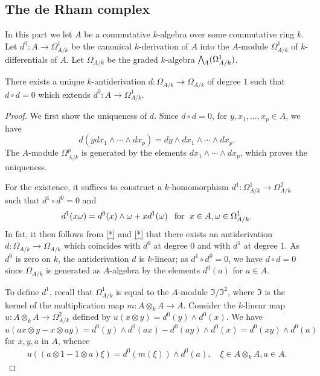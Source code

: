 \subsection{The de Rham complex}
In this part we let $A$ be a commutative $k$-algebra over some commutative ring $k$. Let $d^0:A\to\Omega_{A/k}^1$ be the canonical $k$-derivation of $A$ into the $A$-module $\Omega_{A/k}^1$ of $k$-differentials of $A$. Let $\Omega_{A/k}$ be the graded $k$-algebra $\bigw_A(\Omega_{A/k}^1)$.
\begin{proposition}\label{module complex de Rham antiderivation exist}
There exists a unique $k$-antiderivation $d:\Omega_{A/k}\to\Omega_{A/k}$ of degree $1$ such that $d\circ d=0$ which extends $d^0:A\to\Omega_{A/k}^1$.
\end{proposition}
\begin{proof}
We first show the uniqueness of $d$. Since $d\circ d=0$, for $y,x_1,\dots,x_p\in A$, we have
\[d(y dx_1\wedge\cdots\wedge dx_p)=dy\wedge dx_1\wedge\cdots\wedge dx_p.\]
The $A$-module $\Omega_{A/k}^p$ is generated by the elements $dx_1\wedge\cdots\wedge dx_p$, which proves the uniqueness.\par
For the existence, it suffices to construct a $k$-homomorphism $d^1:\Omega_{A/k}^1\to\Omega_{A/k}^2$ such that $d^1\circ d^0=0$ and
\begin{equation}\label{module complex de Rham antiderivation exist-1}
d^1(x\omega)=d^0(x)\wedge\omega+xd^1(\omega)\hspace{8pt}\text{for}\hspace{6pt} x\in A,\omega\in\Omega_{A/k}^1.
\end{equation}
In fat, it then follows from \cref{*} and \cref{*} that there exists an antiderivation $d:\Omega_{A/k}\to\Omega_{A/k}$ which coincides with $d^0$ at degree $0$ and with $d^1$ at degree $1$. As $d^0$ is zero on $k$, the antiderivation $d$ is $k$-linear; as $d^1\circ d^0=0$, we have $d\circ d=0$ since $\Omega_{A/k}$ is generated as $A$-algebra by the elements $d^0(a)$ for $a\in A$.\par
To define $d^1$, recall that $\Omega_{A/k}^1$ is equal to the $A$-module $\mathfrak{I}/\mathfrak{I}^2$, where $\mathfrak{I}$ is the kernel of the multiplication map $m:A\otimes_kA\to A$. Consider the $k$-linear map $u:A\otimes_kA\to\Omega_{A/k}^2$ defined by $u(x\otimes y)=d^0(y)\wedge d^0(x)$. We have
\[u(ax\otimes y-x\otimes ay)=d^0(y)\wedge d^0(ax)-d^0(ay)\wedge d^0(x)=d^0(xy)\wedge d^0(a)\]
for $x,y,a$ in $A$, whence
\begin{align}\label{module complex de Rham antiderivation exist-2}
u((a\otimes 1-1\otimes a)\xi)=d^0(m(\xi))\wedge d^0(a),\quad \xi\in A\otimes_kA,a\in A.

\end{align}
\end{proof}

